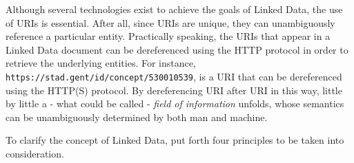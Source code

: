 Although several technologies exist to achieve the goals of Linked Data, the use of URIs is essential. After all, since URIs are unique, they can unambiguously reference a particular entity. Practically speaking, the URIs that appear in a Linked Data document can be dereferenced using the HTTP protocol in order to retrieve the underlying entities. For instance, \texttt{https://stad.gent/id/concept/530010539}, is a URI that can be dereferenced using the HTTP(S) protocol. By dereferencing URI after URI in this way, little by little a - what could be called - \textit{field of information} unfolds, whose semantics can be unambiguously determined by both man and machine. \citep{bizer2011linked}

To clarify the concept of Linked Data, \citet{berners2006linked} put forth four principles to be taken into consideration.

